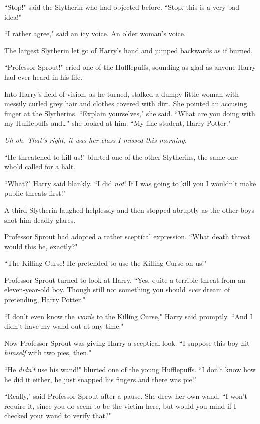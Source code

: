 ``Stop!" said the Slytherin who had objected before. ``Stop, this is a very bad idea!"

``I rather agree," said an icy voice. An older woman's voice.

The largest Slytherin let go of Harry's hand and jumped backwards as if burned.

``Professor Sprout!" cried one of the Hufflepuffs, sounding as glad as anyone Harry had ever heard in his life.

Into Harry's field of vision, as he turned, stalked a dumpy little woman with messily curled grey hair and clothes covered with dirt. She pointed an accusing finger at the Slytherins. ``Explain yourselves," she said. ``What are you doing with my Hufflepuffs and…" she looked at him. ``My fine student, Harry Potter."

\emph{Uh oh. That's right, it was \emph{her} class I missed this morning.}

``He threatened to kill us!" blurted one of the other Slytherins, the same one who'd called for a halt.

``What?" Harry said blankly. ``I did \emph{not}! If I was going to kill you I wouldn't make public threats first!"

A third Slytherin laughed helplessly and then stopped abruptly as the other boys shot him deadly glares.

Professor Sprout had adopted a rather sceptical expression. ``What death threat would this be, exactly?"

``The Killing Curse! He pretended to use the Killing Curse on us!"

Professor Sprout turned to look at Harry. ``Yes, quite a terrible threat from an eleven-year-old boy. Though still not something you should \emph{ever} dream of pretending, Harry Potter."

``I don't even know the \emph{words} to the Killing Curse," Harry said promptly. ``And I didn't have my wand out at any time."

Now Professor Sprout was giving Harry a sceptical look. ``I suppose this boy hit \emph{himself} with two pies, then."

``He \emph{didn't} use his wand!" blurted one of the young Hufflepuffs. ``I don't know how he did it either, he just snapped his fingers and there was pie!"

``Really," said Professor Sprout after a pause. She drew her own wand. ``I won't require it, since you do seem to be the victim here, but would you mind if I checked your wand to verify that?"


